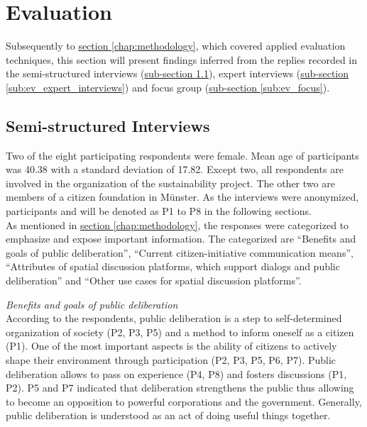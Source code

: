 \section{Evaluation}
\label{chap:evaluation}
Subsequently to \hyperref[chap:methodology]{section \ref{chap:methodology}}, which covered applied evaluation techniques, this section will present findings inferred from the replies recorded in the semi-structured interviews (\hyperref[sub:ev_interviews]{sub-section \ref{sub:ev_interviews}}), expert interviews (\hyperref[sub:ev_expert_interviews]{sub-section \ref{sub:ev_expert_interviews}}) and focus group (\hyperref[sub:ev_focus]{sub-section \ref{sub:ev_focus}}).

\subsection{Semi-structured Interviews}
\label{sub:ev_interviews}
Two of the eight participating respondents were female. Mean age of participants was 40.38 with a standard deviation of 17.82. Except two, all respondents are involved in the organization of the sustainability project. The other two are members of a citizen foundation in M{\"u}nster. As the interviews were anonymized, participants and will be denoted as P1 to P8 in the following sections.\\
As mentioned in \hyperref[chap:methodology]{section \ref{chap:methodology}}, the responses were categorized to emphasize and expose important information. The categorized are ``Benefits and goals of public deliberation'', ``Current citizen-initiative communication means'', ``Attributes of spatial discussion platforms, which support dialogs and public deliberation'' and ``Other use cases for spatial discussion platforms''.

\textit{Benefits and goals of public deliberation}\\
According to the respondents, public deliberation is a step to self-determined organization of society (P2, P3, P5) and a method to inform oneself as a citizen (P1). One of the most important aspects is the ability of citizens to actively shape their environment through participation (P2, P3, P5, P6, P7). Public deliberation allows to pass on experience (P4, P8) and fosters discussions (P1, P2). P5 and P7 indicated that deliberation strengthens the public thus allowing to become an opposition to powerful corporations and the government. Generally, public deliberation is understood as an act of doing useful things together.

